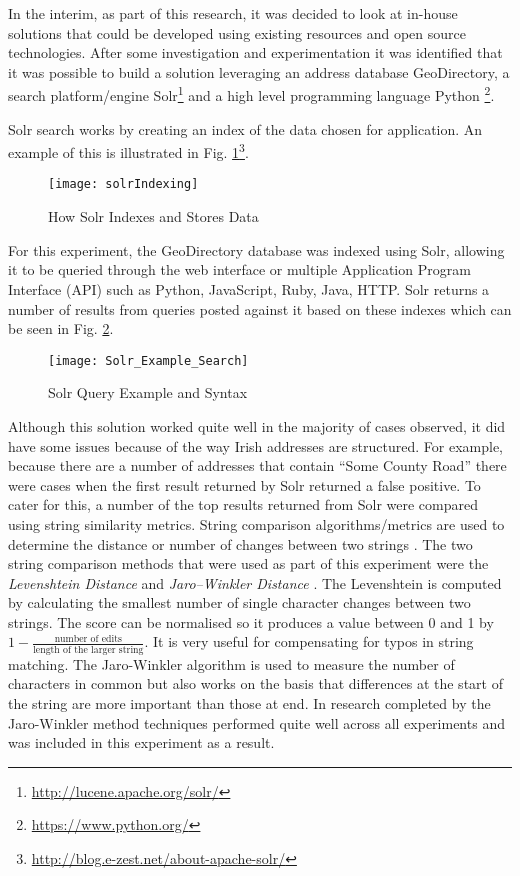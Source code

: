 In the interim, as part of this research, it was decided to look at in-house solutions that could be developed using existing resources and open source technologies. After some investigation and experimentation it was identified that it was possible to build a solution leveraging an address database GeoDirectory, a search platform/engine Solr\footnote{\url{http://lucene.apache.org/solr/}} and a high level programming language Python \footnote{\url{https://www.python.org/}}.


Solr search works by creating an index of the data chosen for application. An example of this is illustrated in Fig. \ref{fig:solrIndexing}\footnote{\url{http://blog.e-zest.net/about-apache-solr/}}. 

\begin{figure}[H]
	\texttt{[image: solrIndexing]}
	\caption[Illustration of Inverted Indexing]
	{How Solr Indexes and Stores Data}
	\label{fig:solrIndexing}
\end{figure}

For this experiment, the GeoDirectory database was indexed using Solr, allowing it to be queried through the web interface or multiple Application Program Interface (API) such as Python, JavaScript, Ruby, Java, HTTP. Solr returns a number of results from queries posted against it based on these indexes which can be seen in Fig. \ref{fig:Solr_Example_Search from Web Interface}.

\begin{figure}[H]
	\texttt{[image: Solr\_Example\_Search]}
	\caption{Solr Query Example and Syntax}
	\label{fig:Solr_Example_Search from Web Interface}
\end{figure}

Although this solution worked quite well in the majority of cases observed, it did have some issues because of the way Irish addresses are structured. For example, because there are a number of addresses that contain ``Some County Road'' there were cases when the first result returned by Solr returned a false positive. To cater for this, a number of the top results returned from Solr were compared using string similarity metrics. String comparison algorithms/metrics are used to determine the distance or number of changes between two strings \citep{wagner_string--string_1974}. The two string comparison methods that were used as part of this experiment were the \textit{Levenshtein Distance} \citep{levenshtein_binary_1966} and \textit{Jaro–Winkler Distance} \citep{winkler_string_1990}. The Levenshtein is computed by calculating the smallest number of single character changes between two strings. The score can be normalised so it produces a value between 0 and 1 by $1 -\frac{\text{number of edits}}{\text{length of the larger string}}$. It is very useful for compensating for typos in string matching. The Jaro-Winkler algorithm is used to measure the number of characters in common but also works on the basis that differences at the start of the string are more important than those at end. In research completed by \cite{christen_comparison_2006} the Jaro-Winkler method techniques performed quite well across all experiments and was included in this experiment as a result. 

